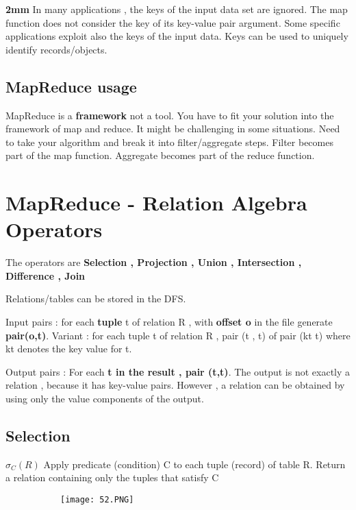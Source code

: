 \documentclass{article}
\begin{document}
\textbf{2mm}
In many applications , the keys of the input data set are ignored. The map function does not consider the key of its key-value pair argument.
Some specific applications exploit also the keys of the input data.
Keys can be used to uniquely identify records/objects.


\subsection{MapReduce usage}
MapReduce is a \textbf{framework} not a tool. You have to fit your solution into the framework of map and reduce.
It might be challenging in some situations.
Need to take your algorithm and break it into filter/aggregate steps. 
Filter becomes part of the map function.
Aggregate becomes part of the reduce function.

\section{MapReduce - Relation Algebra Operators}

The operators are \textbf{Selection , Projection , Union , Intersection , Difference , Join}

Relations/tables can be stored in the DFS.

Input pairs : for each \textbf{tuple} t of relation R , with \textbf{offset o } in the file generate \textbf{pair(o,t)}.
Variant : for each tuple t of relation R , pair (t , t) of pair (kt t) where kt denotes the key value for t.

Output pairs : For each \textbf{t in the result , pair (t,t)}.
The output is not exactly a relation , because it has key-value pairs. However , a relation can be obtained by using only the value components of the output.

\subsection{Selection}

$\sigma_C(R)$
Apply predicate (condition) C to each tuple (record) of table R. Return a relation containing only the tuples that satisfy C

\begin{figure}[ht!]
  \centering
  \begin{subfigure}[b]{0.5\linewidth}
    \texttt{[image: 52.PNG]}
  \end{subfigure}
\end{figure}
\end{document}
